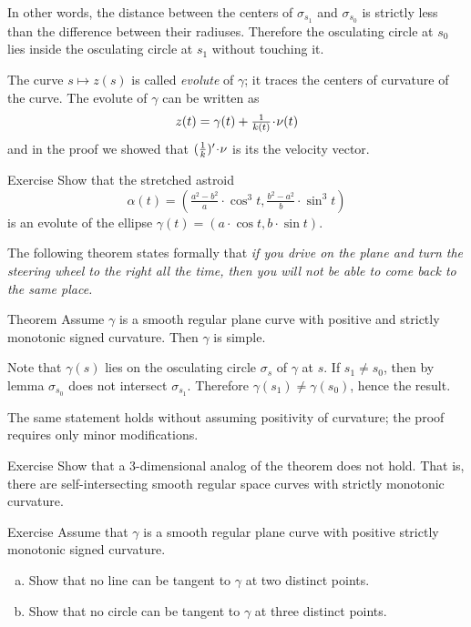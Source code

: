 In other words, the distance between the centers of $\sigma_{s_1}$ and $\sigma_{s_0}$
is strictly less than the difference between their radiuses.
Therefore the osculating circle at $s_0$ lies inside the osculating circle at $s_1$ without touching it.
\qeds

The curve $s\mapsto z(s)$ is called \emph{evolute} of $\gamma$; 
it traces the centers of curvature of the curve. 
The evolute of $\gamma$ can be written as 
\[z(t)=\gamma(t)+\tfrac1{\kur(t)}\cdot \nu(t)\] and  
in the proof we showed that $(\tfrac1{\kur})'\cdot\nu$ is its the velocity vector.

\begin{thm}{Exercise}\label{ex:evolute-of-ellipse}
Show that the stretched astroid 
\[\alpha(t)=(\tfrac{a^2-b^2}{a}\cdot \cos^3 t,  \tfrac{b^2-a^2}{b}\cdot\sin^3 t)\]
is an evolute of the ellipse $\gamma(t)= (a\cdot \cos t, b\cdot\sin t)$.
\end{thm}



The following theorem states formally that 
\emph{if you drive on the plane and turn the steering wheel to the right all the time,
then you will not be able to come back to the same place.}

\begin{thm}{Theorem}\label{thm:spiral}
Assume $\gamma$ is a smooth regular plane curve with positive and strictly monotonic signed curvature. 
Then $\gamma$ is simple.
\end{thm}

Note that $\gamma(s)$ lies on the osculating circle $\sigma_s$ of $\gamma$ at $s$.
If $s_1\ne s_0$, then by lemma $\sigma_{s_0}$ does not intersect $\sigma_{s_1}$.
Therefore $\gamma(s_1)\ne \gamma(s_0)$,
hence the result.\qeds

The same statement holds without assuming positivity of curvature; the proof requires only minor modifications.

\begin{thm}{Exercise}\label{ex:3D-spiral}
Show that a 3-dimensional analog of the theorem does not hold.
That is, there are self-intersecting smooth regular space curves with strictly monotonic curvature.
\end{thm}

\begin{thm}{Exercise}\label{ex:double-tangent}
Assume that $\gamma$ is a smooth regular plane curve with positive strictly monotonic signed curvature.
\begin{enumerate}[(a)]
\item\label{ex:double-tangent:a}Show that no line can be tangent to $\gamma$ at two distinct points.
\item Show that no circle can be tangent to $\gamma$ at three distinct points. 
\end{enumerate}
\end{thm} %

